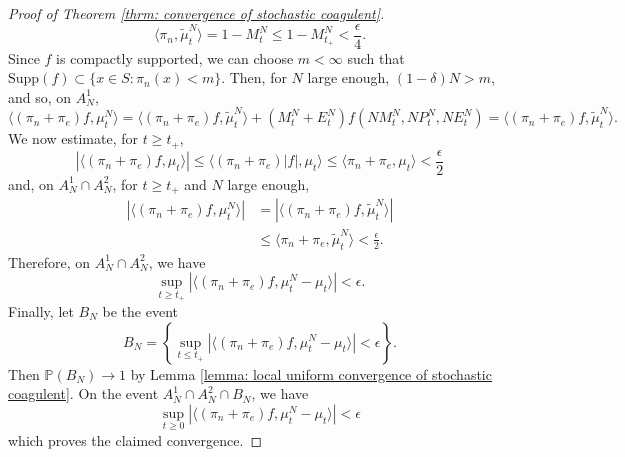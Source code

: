 \begin{proof}[Proof of Theorem \ref{thrm: convergence of stochastic coagulent}]
\begin{equation}
    \langle \pi_n, \widetilde{\mu}^N_t\rangle =1-M^N_t \leq 1-M^N_{t_+} <\frac{\epsilon}{4}.
\end{equation} Since $f$ is compactly supported, we can choose $m<\infty$ such that $\text{Supp}(f)\subset \{x\in S: \pi_n(x)<m\}$. Then, for $N$ large enough, $(1-\delta)N>m$, and so, on $A^1_N$, \begin{equation}
    \langle (\pi_n+\pi_e)f,\mu^N_t\rangle = \langle (\pi_n+\pi_e)f,\widetilde{\mu}^N_t\rangle+(M^N_t+E^N_t)f(NM^N_t,NP^N_t, NE^N_t) =  \langle (\pi_n+\pi_e)f,\widetilde{\mu}^N_t\rangle.
\end{equation} We now estimate, for $t\geq t_+$, \begin{equation}
    |\langle (\pi_n+\pi_e)f, \mu_t\rangle|\leq \langle (\pi_n+\pi_e)|f|, \mu_t\rangle \leq \langle \pi_n+\pi_e, \mu_t\rangle <\frac{\epsilon}{2}
\end{equation} and, on $A^1_N\cap A^2_N$, for $t\geq t_+$  and $N$ large enough, \begin{equation} \begin{split}
    |\langle (\pi_n+\pi_e)f, \mu^N_t\rangle|&=|\langle (\pi_n+\pi_e)f, \widetilde{\mu}^N_t\rangle | \\ & \leq \langle \pi_n+\pi_e, \widetilde{\mu}^N_t\rangle <\frac{\epsilon}{2}.   \end{split}
\end{equation} Therefore, on $A^1_N\cap A^2_N$, we have \begin{equation}
    \sup_{t\geq t_+}|\langle (\pi_n+\pi_e)f, \mu^N_t-\mu_t\rangle| <\epsilon.
\end{equation} Finally, let $B_N$ be the event \begin{equation}
    B_N=\left\{\sup_{t\leq t_+} |\langle (\pi_n+\pi_e)f, \mu^N_t-\mu_t\rangle |<\epsilon\right\}.
\end{equation} Then $\mathbb{P}(B_N)\rightarrow 1$ by Lemma \ref{lemma: local uniform convergence of stochastic coagulent}. On the event $A^1_N\cap A^2_N\cap B_N$, we have \begin{equation}
    \sup_{t\geq 0} |\langle (\pi_n+\pi_e)f, \mu^N_t-\mu_t\rangle |<\epsilon
\end{equation} which proves the claimed convergence.
\end{proof}